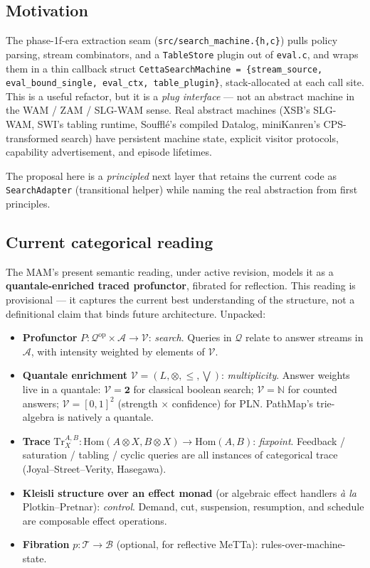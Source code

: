 \documentclass[11pt]{article}
\newcommand{\code}[1]{\texttt{#1}}
\newcommand{\PathMap}{\textup{PathMap}}
\begin{document}
\subsection{Motivation}

The phase-1f-era extraction seam (\code{src/search\_machine.\{h,c\}})
pulls policy parsing, stream combinators, and a \code{TableStore}
plugin out of \code{eval.c}, and wraps them in a thin callback struct
\code{CettaSearchMachine = \{stream\_source, eval\_bound\_single,
  eval\_ctx, table\_plugin\}}, stack-allocated at each call site.
This is a useful refactor, but it is a \emph{plug interface} — not an
abstract machine in the WAM / ZAM / SLG-WAM sense.  Real abstract
machines (XSB's SLG-WAM, SWI's tabling runtime, Soufflé's compiled
Datalog, miniKanren's CPS-transformed search) have persistent machine
state, explicit visitor protocols, capability advertisement, and
episode lifetimes.

The proposal here is a \emph{principled} next layer that retains the
current code as \code{SearchAdapter} (transitional helper) while
naming the real abstraction from first principles.

\subsection{Current categorical reading}

The MAM's present semantic reading, under active revision, models it
as a \textbf{quantale-enriched traced profunctor}, fibrated for
reflection.  This reading is provisional --- it captures the current
best understanding of the structure, not a definitional claim that
binds future architecture.  Unpacked:

\begin{itemize}
\item \textbf{Profunctor} $P : \mathcal{Q}^{\mathrm{op}} \times
  \mathcal{A} \to \mathcal{V}$: \emph{search}.  Queries in
  $\mathcal{Q}$ relate to answer streams in $\mathcal{A}$, with
  intensity weighted by elements of $\mathcal{V}$.
\item \textbf{Quantale enrichment} $\mathcal{V} = (L, \otimes, \le,
  \bigvee)$: \emph{multiplicity}.  Answer weights live in a quantale:
  $\mathcal{V} = \mathbf{2}$ for classical boolean search;
  $\mathcal{V} = \mathbb{N}$ for counted answers;
  $\mathcal{V} = [0,1]^2$ (strength $\times$ confidence) for PLN.
  \PathMap{}'s trie-algebra is natively a quantale.
\item \textbf{Trace} $\mathrm{Tr}_X^{A,B} : \mathrm{Hom}(A \otimes X, B
  \otimes X) \to \mathrm{Hom}(A, B)$: \emph{fixpoint}.  Feedback /
  saturation / tabling / cyclic queries are all instances of
  categorical trace (Joyal--Street--Verity, Hasegawa).
\item \textbf{Kleisli structure over an effect monad} (or algebraic
  effect handlers \emph{\`a la} Plotkin--Pretnar): \emph{control}.
  Demand, cut, suspension, resumption, and schedule are composable
  effect operations.
\item \textbf{Fibration} $p : \mathcal{T} \to \mathcal{B}$ (optional,
  for reflective MeTTa): rules-over-machine-state.
\end{itemize}
\end{document}
